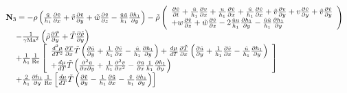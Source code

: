 \begin{equation*}
  \begin{array}{l}
 {\bf{N}}_3  =  - \rho \left( {\frac{{\tilde u}}{{h_1 }}\frac{{\partial \tilde v}}{{\partial x}} + \tilde v\frac{{\partial \tilde v}}{{\partial y}} + \tilde w\frac{{\partial \tilde v}}{{\partial z}} - \frac{{\tilde u\tilde u}}{{h_1 }}\frac{{\partial h_1 }}{{\partial y}}} \right) - \tilde \rho \left( \begin{array}{l}
 \frac{{\partial \tilde v}}{{\partial t}} + \frac{{\tilde u}}{{h_1 }}\frac{{\partial v}}{{\partial x}} + \frac{u}{{h_1 }}\frac{{\partial \tilde v}}{{\partial x}} + \frac{{\tilde u}}{{h_1 }}\frac{{\partial \tilde v}}{{\partial x}} + \tilde v\frac{{\partial v}}{{\partial y}} + v\frac{{\partial \tilde v}}{{\partial y}} + \tilde v\frac{{\partial \tilde v}}{{\partial y}} \\
  + w\frac{{\partial \tilde v}}{{\partial z}} + \tilde w\frac{{\partial \tilde v}}{{\partial z}} - 2\frac{{\tilde uu}}{{h_1 }}\frac{{\partial h_1 }}{{\partial y}} - \frac{{\tilde u\tilde u}}{{h_1 }}\frac{{\partial h_1 }}{{\partial y}} \\
 \end{array} \right) \\
 \quad \; - \frac{1}{{\gamma {\rm{Ma}}^2 }}\left( {\tilde \rho \frac{{\partial \tilde T}}{{\partial y}} + \tilde T\frac{{\partial \tilde \rho }}{{\partial y}}} \right) \\
 \quad \; + \frac{1}{{h_1 }}\frac{1}{{{\mathop{\rm Re}\nolimits} }}\left[ \begin{array}{l}
 \frac{{d^2 \mu }}{{dT^2 }}\frac{{\partial T}}{{\partial x}}\tilde T\left( {\frac{{\partial \tilde u}}{{\partial y}} + \frac{1}{{h_1 }}\frac{{\partial \tilde v}}{{\partial x}} - \frac{{\tilde u}}{{h_1 }}\frac{{\partial h_1 }}{{\partial y}}} \right) + \frac{{d\mu }}{{dT}}\frac{{\partial \tilde T}}{{\partial x}}\left( {\frac{{\partial \tilde u}}{{\partial y}} + \frac{1}{{h_1 }}\frac{{\partial \tilde v}}{{\partial x}} - \frac{{\tilde u}}{{h_1 }}\frac{{\partial h_1 }}{{\partial y}}} \right) \\
  + \frac{{d\mu }}{{dT}}\tilde T\left( {\frac{{\partial ^2 \tilde u}}{{\partial x\partial y}} + \frac{1}{{h_1 }}\frac{{\partial ^2 \tilde v}}{{\partial x^2 }} - \frac{{\partial \tilde u}}{{\partial x}}\frac{1}{{h_1 }}\frac{{\partial h_1 }}{{\partial y}}} \right) \\
 \end{array} \right] \\
 \quad \; + \frac{2}{{h_1 }}\frac{{\partial h_1 }}{{\partial y}}\frac{1}{{{\mathop{\rm Re}\nolimits} }}\left[ {\frac{{d\mu }}{{dT}}\tilde T\left( {\frac{{\partial \tilde v}}{{\partial y}} - \frac{1}{{h_1 }}\frac{{\partial \tilde u}}{{\partial x}} - \frac{{\tilde v}}{{h_1 }}\frac{{\partial h_1 }}{{\partial y}}} \right)} \right] \\

\end{array}
\end{equation*}
